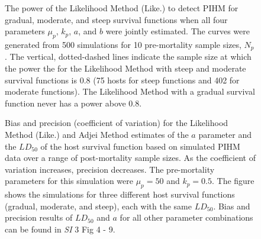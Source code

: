 \documentclass[12pt, a4paper]{article}
\begin{document}
\begin{figure}

    \captionsetup{justification=raggedright, singlelinecheck=false}

    \caption{The power of the Likelihood Method (Like.) to detect PIHM for gradual, moderate, and steep survival functions when all four parameters $\mu_p$, $k_p$, $a$, and $b$ were jointly estimated. The curves were generated from 500 simulations for 10 pre-mortality sample sizes, $N_p$. The vertical, dotted-dashed lines indicate the sample size at which the power the for the Likelihood Method with steep and moderate survival functions is 0.8 (75 hosts for steep functions and 402 for moderate functions). The Likelihood Method with a gradual survival function never has a power above 0.8.}

    \label{fig:real_power}

\end{figure}

\begin{figure}


    \captionsetup{justification=raggedright, singlelinecheck=false}

    \caption{Bias and precision (coefficient of variation) for the Likelihood Method (Like.) and Adjei Method estimates of the $a$ parameter and the $LD_{50}$ of the host survival function based on simulated PIHM data over a range of post-mortality sample sizes.  As the coefficient of variation increases, precision decreases. The pre-mortality parameters for this simulation were $\mu_p = 50$ and $k_p = 0.5$.  The figure shows the simulations for three different host survival functions (gradual, moderate, and steep), each with the same $LD_{50}$.  Bias and precision results of $LD_{50}$ and $a$ for all other parameter combinations can be found in \emph{SI} 3 Fig 4 - 9.}

    \label{fig:question2}

\end{figure}
\end{document}
